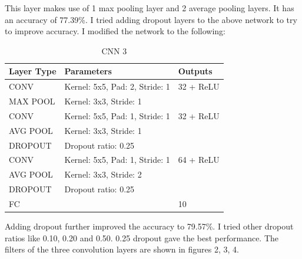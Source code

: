 \documentclass[10pt,twocolumn,letterpaper]{article}
\begin{document}
This layer makes use of 1 max pooling layer and 2 average pooling layers. It has an accuracy of 77.39\%. I tried adding dropout layers to the above network to try to improve accuracy. I modified the network to the following:

\begin{table}[h]
\begin{tabular}{|l|l|l|}
\hline
Layer Type & Parameters                     & Outputs \\ \hline
CONV       & Kernel: 5x5, Pad: 2, Stride: 1 & 32 + ReLU     \\ \hline
MAX POOL   & Kernel: 3x3, Stride: 1         &         \\ \hline
CONV       & Kernel: 5x5, Pad: 1, Stride: 1 & 32 + ReLU      \\ \hline
AVG POOL   & Kernel: 3x3, Stride: 1         &         \\ \hline
DROPOUT   & Dropout ratio: 0.25         &         \\ \hline
CONV       & Kernel: 5x5, Pad: 1, Stride: 1 & 64 + ReLU     \\ \hline
AVG POOL   & Kernel: 3x3, Stride: 2         &         \\ \hline
DROPOUT   & Dropout ratio: 0.25         &         \\ \hline
FC         &                                & 10      \\ \hline
\end{tabular}
\label{net3}
\caption{CNN 3}
\end{table}

Adding dropout further improved the accuracy to 79.57\%. I tried other dropout ratios like 0.10, 0.20 and 0.50. 0.25 dropout gave the best performance. The filters of the three convolution layers are shown in figures 2, 3, 4.
\end{document}
